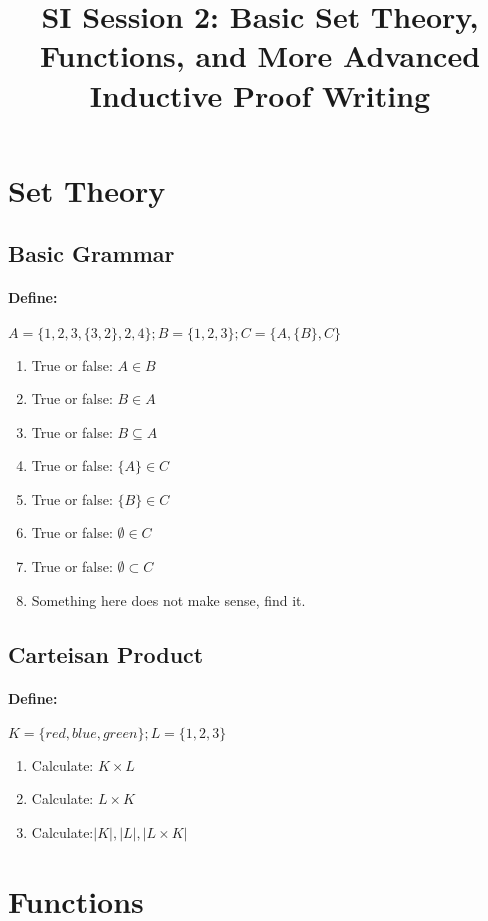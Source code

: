 \documentclass[12pt]{article}
\date{}
\author{}
\title{SI Session 2: Basic Set Theory, Functions, and More Advanced Inductive Proof Writing}
\begin{document}
	\maketitle

\section{Set Theory}
	\subsection{Basic Grammar}
	\paragraph{Define: } $A =\{1,2,3,\{3,2\},2,4\};   B=\{1,2,3\}; C=\{A,\{B\},C\}$
	\begin{enumerate}
	\item True or false: $A \in B$
	\item True or false: $B \in A$
	\item True or false: $B \subseteq A$
	\item True or false: $\{A\}\in C$
	\item True or false: $\{B\} \in C$
	\item True or false: $\emptyset \in C$
	\item True or false: $\emptyset \subset C$
	\item Something here does not make sense, find it.
	\end{enumerate} 
	\subsection{Carteisan Product}
	\paragraph{Define: } $K=\{red, blue, green\}; L=\{1,2,3\}$
	\begin{enumerate}
	\item Calculate: $K \times L$
	\item Calculate: $L \times K$
	\item Calculate:$ |K|, |L|, |L\times K|$
	\end{enumerate}
\newpage
\section{Functions}
\end{document}
